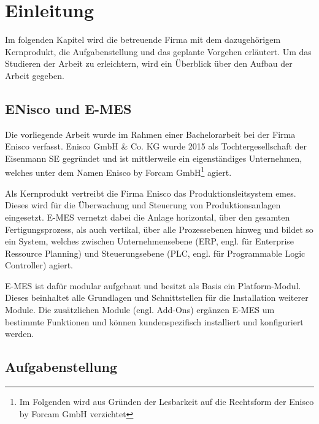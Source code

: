 \chapter{Einleitung\label{chap1:Erstes-Kapitel}}

Im folgenden Kapitel wird die betreuende Firma mit dem dazugehörigem Kernprodukt, die Aufgabenstellung und das geplante Vorgehen erläutert. Um das Studieren der Arbeit zu erleichtern, wird ein Überblick über den Aufbau der Arbeit gegeben.

\section{ENisco und E-MES\label{sec1.1:unterpunkt-1}}

Die vorliegende Arbeit wurde im Rahmen einer Bachelorarbeit bei der Firma Enisco verfasst. Enisco GmbH \& Co. KG wurde 2015 als Tochtergesellschaft der Eisenmann SE gegründet und ist mittlerweile ein eigenständiges Unternehmen, welches unter dem Namen \glqq Enisco by Forcam GmbH\footnote{Im Folgenden wird aus Gründen der Lesbarkeit auf die Rechtsform der Enisco by Forcam GmbH verzichtet}\grqq{} agiert.

Als Kernprodukt vertreibt die Firma Enisco das Produktionsleitsystem \glqq \gls{emes}\grqq{}. Dieses wird für die Überwachung und Steuerung von Produktionsanlagen eingesetzt. E-MES vernetzt dabei die Anlage horizontal, über den gesamten Fertigungsprozess, als auch vertikal, über alle Prozessebenen hinweg und bildet so ein System, welches zwischen Unternehmensebene (ERP, engl. für Enterprise Ressource Planning) und Steuerungsebene (PLC, engl. für Programmable Logic
Controller) agiert. \cite{EniscobyForcamGmbH.2021}

E-MES ist dafür modular aufgebaut und besitzt als Basis ein Platform-Modul. Dieses beinhaltet alle Grundlagen und Schnittstellen für die Installation weiterer Module. Die zusätzlichen Module (engl. Add-Ons) ergänzen E-MES um bestimmte Funktionen und können kundenspezifisch installiert und konfiguriert werden.

\section{Aufgabenstellung\label{sec1.2:Unterpunkt-2}}

